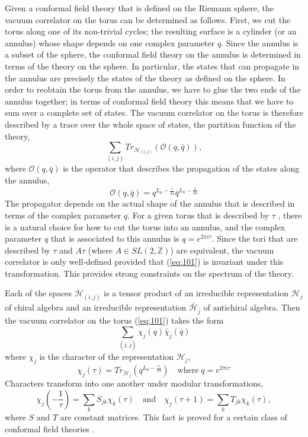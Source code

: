 \documentclass[a4paper,12pt]{article}
\theoremstyle{definition} \newtheorem{Def}{Definition}
\begin{document}
Given a conformal field theory that is defined on the Riemann sphere, the vacuum
correlator on the torus can be determined as follows. First, we cut the torus along one
of its non-trivial cycles; the resulting surface is a cylinder (or an annulus) whose shape
depends on one complex parameter $q$. Since the annulus is a subset of the sphere, the
conformal field theory on the annulus is determined in terms of the theory on the sphere.
In particular, the states that can propagate in the annulus are precisely the states of
the theory as defined on the sphere.
In order to reobtain the torus from the annulus, we have to glue the two ends of
the annulus together; in terms of conformal field theory this means that we have to sum
over a complete set of states. The vacuum correlator on the torus is therefore described
by a trace over the whole space of states, the partition function of the theory,
\begin{equation}
  \label{eq:101}
  \sum_{(i,j)}Tr_{\mathcal{H}_{(i,j)}}(\mathcal{O}(q,\bar q)),
\end{equation}
where $\mathcal{O}(q,\bar q)$ is the operator that describes the propagation of the states along the annulus,
\begin{equation}
  \label{eq:102}
  \mathcal{O}(q,\bar q)=q^{L_0-\frac{c}{24}}\bar q^{\bar L_0-\frac{\bar c}{24}}
\end{equation}
The propagator depends on the actual shape of the annulus that is described in terms
of the complex parameter $q$. For a given torus that is described by $\tau$ , there is a natural
choice for how to cut the torus into an annulus, and the complex parameter $q$ that is
associated to this annulus is $q=e^{2\pi i \tau}$. Since the tori that are described by $\tau$ and $A\tau$
(where $A \in SL(2, \mathbb{Z})$) are equivalent, the vacuum correlator is only well-defined provided
that (\ref{eq:101}) is invariant under this transformation. This provides strong constraints on
the spectrum of the theory.

Each of the spaces $\mathcal{H}_{(i,j)}$ is a tensor product of an irreducible representation $\mathcal{H}_j$ of chiral algebra and an irreducible representation $\bar{\mathcal{H}}_{\bar{j}}$ of antichiral algebra. Then the vacuum correlator on the torus (\ref{eq:101}) takes the form
\begin{equation}
  \label{eq:103}
  \sum_{(j,\bar j)}\chi_j(q)\bar \chi_{\bar j}(\bar q)
\end{equation}
where $\chi_j$ is the character of the representation $\mathcal{H}_j$,
\begin{equation}
  \label{eq:104}
  \chi_j(\tau)=Tr_{\mathcal{H}_j}(q^{L_0-\frac{c}{24}})\quad \mbox{where}\; q=e^{2\pi i \tau}
\end{equation}
Characters transform into one another under modular transformations,
\begin{equation}
  \label{eq:107}
  \chi_j(-\frac{1}{\tau})=\sum_k S_{jk}\chi_k(\tau)\quad \mbox{and}\quad \chi_j(\tau+1)=\sum_kT_{jk}\chi_k(\tau),
\end{equation}
where $S$ and $T$ are constant matrices. This fact is proved for a certain class of conformal field theories \cite{gaberdiel2000icf}. 
\end{document}
